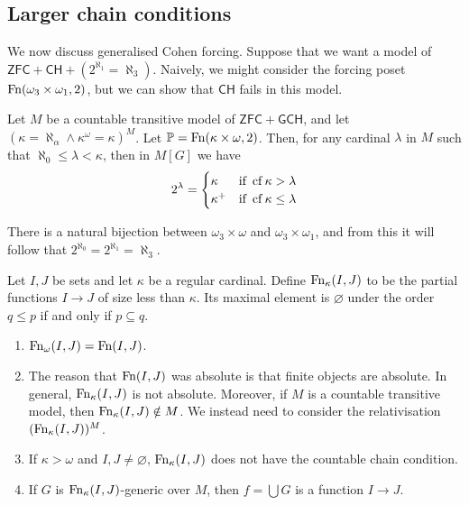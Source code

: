\subsection{Larger chain conditions}
We now discuss generalised Cohen forcing.
Suppose that we want a model of \( \mathsf{ZFC} + \mathsf{CH} + (2^{\aleph_1} = \aleph_3) \).
Naively, we might consider the forcing poset \( \operatorname{Fn}(\omega_3 \times \omega_1, 2) \), but we can show that \( \mathsf{CH} \) fails in this model.
\begin{proposition}
    Let \( M \) be a countable transitive model of \( \mathsf{ZFC} + \mathsf{GCH} \), and let \( (\kappa = \aleph_\alpha \wedge \kappa^\omega = \kappa)^M \).
    Let \( \mathbb P = \operatorname{Fn}(\kappa \times \omega, 2) \).
    Then, for any cardinal \( \lambda \) in \( M \) such that \( \aleph_0 \leq \lambda < \kappa \), then in \( M[G] \) we have
    \[ 2^\lambda = \begin{cases}
        \kappa & \text{if } \operatorname{cf} \kappa > \lambda \\
        \kappa^+ & \text{if } \operatorname{cf} \kappa \leq \lambda
    \end{cases} \]
\end{proposition}
There is a natural bijection between \( \omega_3 \times \omega \) and \( \omega_3 \times \omega_1 \), and from this it will follow that \( 2^{\aleph_0} = 2^{\aleph_1} = \aleph_3 \).
\begin{definition}
    Let \( I, J \) be sets and let \( \kappa \) be a regular cardinal.
    Define \( \operatorname{Fn}_\kappa(I, J) \) to be the partial functions \( I \to J \) of size less than \( \kappa \).
    Its maximal element is \( \varnothing \) under the order \( q \leq p \) if and only if \( p \subseteq q \).
\end{definition}
\begin{remark}
    \begin{enumerate}
        \item \( \operatorname{Fn}_\omega(I, J) = \operatorname{Fn}(I, J) \).
        \item The reason that \( \operatorname{Fn}(I, J) \) was absolute is that finite objects are absolute.
        In general, \( \operatorname{Fn}_\kappa(I, J) \) is not absolute.
        Moreover, if \( M \) is a countable transitive model, then \( \operatorname{Fn}_\kappa(I, J) \notin M \).
        We instead need to consider the relativisation \( (\operatorname{Fn}_\kappa(I, J))^M \).
        \item If \( \kappa > \omega \) and \( I, J \neq \varnothing \), \( \operatorname{Fn}_\kappa(I, J) \) does not have the countable chain condition.
        \item If \( G \) is \( \operatorname{Fn}_\kappa(I, J) \)-generic over \( M \), then \( f = \bigcup G \) is a function \( I \to J \).
    \end{enumerate}
\end{remark}
